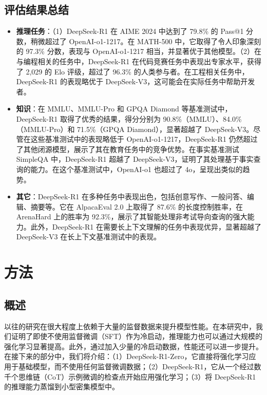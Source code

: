 \documentclass[lang=cn,a4paper,newtx]{elegantpaper}
\newcommand{\dsri}{DeepSeek-R1}
\newcommand{\dsro}{DeepSeek-R1-Zero}
\begin{document}
\subsection{评估结果总结}

\begin{itemize}
  \item \textbf{推理任务}：（1）\dsri{} 在 AIME 2024 中达到了 79.8\% 的 Pass@1 分数，稍微超过了 OpenAI-o1-1217。在 MATH-500 中，它取得了令人印象深刻的 97.3\% 分数，表现与 OpenAI-o1-1217 相当，并显著优于其他模型。（2）在与编程相关的任务中，\dsri{} 在代码竞赛任务中表现出专家水平，获得了 2,029 的 Elo 评级，超过了 96.3\% 的人类参与者。在工程相关任务中，\dsri{} 的表现略优于 DeepSeek-V3，这可能会在实际任务中帮助开发者。
  \item \textbf{知识}：在 MMLU、MMLU-Pro 和 GPQA Diamond 等基准测试中，\dsri{} 取得了优秀的结果，得分分别为 90.8\%（MMLU）、84.0\%（MMLU-Pro）和 71.5\%（GPQA Diamond），显著超越了 DeepSeek-V3。尽管在这些基准测试中的表现略低于 OpenAI-o1-1217，\dsri{} 仍然超过了其他闭源模型，展示了其在教育任务中的竞争优势。在事实基准测试 SimpleQA 中，\dsri{} 超越了 DeepSeek-V3，证明了其处理基于事实查询的能力。在这个基准测试中，OpenAI-o1 也超过了 4o，呈现出类似的趋势。
  \item \textbf{其它}：\dsri{} 在多种任务中表现出色，包括创意写作、一般问答、编辑、摘要等。它在 AlpacaEval 2.0 上取得了 87.6\% 的长度控制胜率，在 ArenaHard 上的胜率为 92.3\%，展示了其智能处理非考试导向查询的强大能力。此外，\dsri{} 在需要长上下文理解的任务中表现优异，显著超越了 DeepSeek-V3 在长上下文基准测试中的表现。
\end{itemize}

\section{方法}

\subsection{概述}

以往的研究在很大程度上依赖于大量的监督数据来提升模型性能。在本研究中，我们证明了即使不使用监督微调（SFT）作为冷启动，推理能力也可以通过大规模的强化学习显著提高。此外，通过加入少量的冷启动数据，性能还可以进一步提升。在接下来的部分中，我们将介绍：（1）\dsro{}，它直接将强化学习应用于基础模型，而不使用任何监督微调数据；（2）\dsri{}，它从一个经过数千个思维链（CoT）示例微调的检查点开始应用强化学习；（3）将 \dsri{} 的推理能力蒸馏到小型密集模型中。
\end{document}
